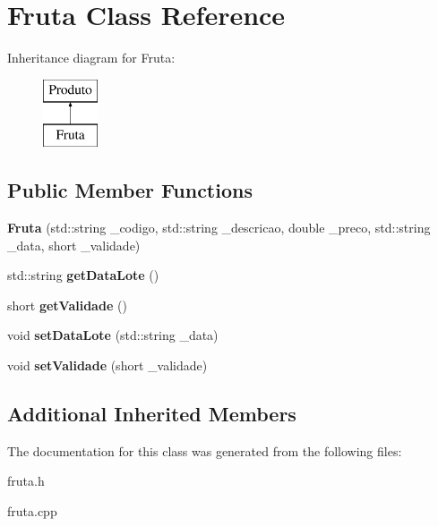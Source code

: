 \hypertarget{classFruta}{}\section{Fruta Class Reference}
\label{classFruta}
Inheritance diagram for Fruta\+:\begin{figure}[H]
\begin{center}
\leavevmode
\includegraphics[height=2.000000cm]{classFruta}
\end{center}
\end{figure}
\subsection*{Public Member Functions}
\begin{DoxyCompactItemize}
\item 
\mbox{\label{classFruta_a91cfd962d492f07be75bccea94e8cc5b}} 
{\bfseries Fruta} (std\+::string \+\_\+codigo, std\+::string \+\_\+descricao, double \+\_\+preco, std\+::string \+\_\+data, short \+\_\+validade)
\item 
\mbox{\label{classFruta_a89525ef74d892639b1a56dbf1c6ffe61}} 
std\+::string {\bfseries get\+Data\+Lote} ()
\item 
\mbox{\label{classFruta_ab12db1faf3d5a0743ab461bc3315832e}} 
short {\bfseries get\+Validade} ()
\item 
\mbox{\label{classFruta_aa6cc01d8af01018e0a90b91e91884c13}} 
void {\bfseries set\+Data\+Lote} (std\+::string \+\_\+data)
\item 
\mbox{\label{classFruta_a779eb0307ab1f8e696d94f7420f43dbe}} 
void {\bfseries set\+Validade} (short \+\_\+validade)
\end{DoxyCompactItemize}
\subsection*{Additional Inherited Members}


The documentation for this class was generated from the following files\+:\begin{DoxyCompactItemize}
\item 
fruta.\+h\item 
fruta.\+cpp\end{DoxyCompactItemize}
